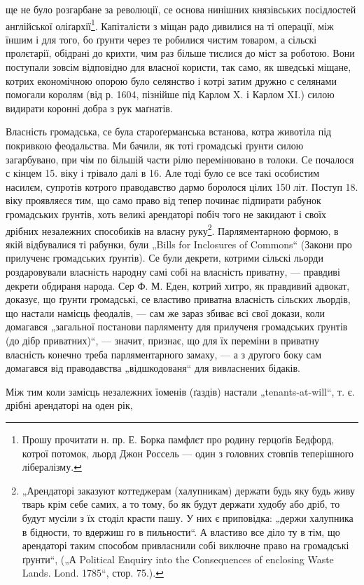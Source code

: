 \parcont{}
ще не було розгарбане за революції, се основа нинішних
князівських посідлостей англійської оліґархії\footnote{
Прошу прочитати н. пр. Е. Борка памфлєт про родину герцоґів
Бедфорд, котрої потомок, льорд Джон Россель — один з головних стовпів
теперішного лібералізму.
}. Капіталісти
з міщан радо дивилися на ті операції, між їншим і для
того, бо ґрунти через те робилися чистим товаром, а сільскі
пролєтарії, обідрані до крихти, чим раз більше тислися
до міст за роботою. Вони поступали зовсім відповідно для
власної користи, так само, як шведські міщане, котрих економічною
опорою було селянство і котрі затим дружно с селянами
помогали королям (від р. 1604, пізнійше під Карлом
X. і Карлом XI.) силою видирати коронні добра з рук
маґнатів.

Власність громадська, се була староґерманська встанова,
котра животіла під покривкою феодальства. Ми бачили,
як тоті громадські ґрунти силою загарбувано, при
чім по більшій части рілю перемінювано в толоки. Се почалося
с кінцем 15. віку і трівало далі в 16. Але тоді було
се все такі особистим насилєм, супротів котрого праводавство
дармо боролося цілих 150 літ. Поступ 18. віку проявляєся
тим, що само право від тепер починає підпирати рабунок
громадських ґрунтів, хоть великі арендаторі побіч
того не закидают і своїх дрібних незалежних способиків на
власну руку\footnote{
„Арендаторі заказуют коттеджерам (халупникам) держати будь
яку будь живу тварь крім себе самих, а то тому, бо як будут держати
худобу або дріб, то будут мусіли з їх стоділ красти пашу. У них є приповідка:
„держи халупника в бідности, то вдержиш го в пильности“.
А властиво все діло ту в тім, що арендаторі таким способом привласнили
собі виключне право на громадські ґрунти“, („А Political Enquiry into
the Consequences of enclosing Waste Lands. Lond. 1785“, стор. 75.).
}.  Парляментарною формою, в якій відбувалися
ті рабунки, були „Bills for Inclosures of Commons“ (Закони
про прилученє громадських ґрунтів). Се були декрети, котрими
сільскі льорди роздаровували власність народну самі
собі на власність приватну, — правдиві декрети обдираня
народа. Сер Ф. М. Еден, котрий хитро, як правдивий адвокат,
доказує, що ґрунти громадські, се властиво приватна
власність сільских льордів, що настали намісць феодалів,
— сам же зараз збиває всі свої докази, коли домагався
„загальної постанови парляменту для прилученя громадських
ґрунтів (до дібр приватних)“, — значит, признає, що
для їх переміни в приватну власність конечно треба парляментарного
замаху, — а з другого боку сам домагався
від праводавства „відшкодованя“ для вивласнених бідаків.

Між тим коли замісць незалежних їоменів (ґаздів) настали
„tenants-at-will“, т. є. дрібні арендаторі на оден рік,
\parbreak{}
